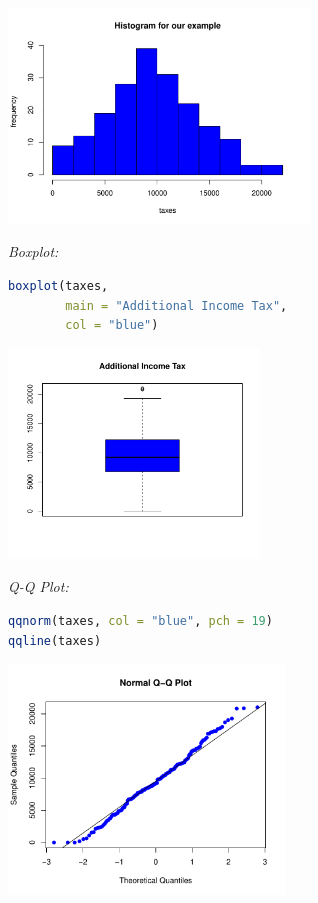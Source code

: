 \begin{example}
\begin{center}
\includegraphics[width=0.6\textwidth]{Section7/images/tax_histogram.pdf}
\end{center}

\textit{Boxplot:}

\begin{lstlisting}[language=R]
boxplot(taxes,
        main = "Additional Income Tax",
        col = "blue")
\end{lstlisting}

\begin{center}
\includegraphics[width=0.5\textwidth]{Section7/images/tax_boxplot.pdf}
\end{center}

\textit{Q-Q Plot:}

\begin{lstlisting}[language=R]
qqnorm(taxes, col = "blue", pch = 19)
qqline(taxes)
\end{lstlisting}

\begin{center}
\includegraphics[width=0.55\textwidth]{Section7/images/tax_qqplot.pdf}
\end{center}


\end{example}
